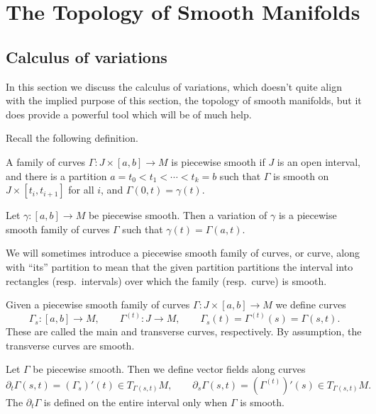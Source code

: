 \section{The Topology of Smooth Manifolds}

\subsection{Calculus of variations}

In this section we discuss the calculus of variations, which doesn't quite align with the implied purpose of this section, the topology
of smooth manifolds, but it does provide a powerful tool which will be of much help.

Recall the following definition.

\bdefn

    A family of curves $\Gamma\colon J\times[a,b]\to M$ is {\emphcolor piecewise smooth} if
    $J$ is an open interval, and there is a partition $a=t_0<t_1<\cdots<t_k=b$ such that $\Gamma$ is smooth on
    $J\times[t_i,t_{i+1}]$ for all $i$, and $\Gamma(0,t)=\gamma(t)$.

    Let $\gamma\colon[a,b]\to M$ be piecewise smooth.
    Then a {\emphcolor variation} of $\gamma$ is a piecewise smooth family of curves $\Gamma$ such that $\gamma(t)=\Gamma(a,t)$.

\edefn

\bnote

    We will sometimes introduce a piecewise smooth family of curves, or curve, along with ``its'' partition to mean that the
    given partition partitions the interval into rectangles (resp.\ intervals) over which the family (resp.\ curve) is smooth.

\enote

Given a piecewise smooth family of curves $\Gamma\colon J\times[a,b]\to M$ we define curves
$$ \Gamma_s\colon[a,b]\to M,\qquad \Gamma^{(t)}\colon J\to M,\qquad \Gamma_s(t) = \Gamma^{(t)}(s) = \Gamma(s,t) . $$
These are called the {\emphcolor main} and {\emphcolor transverse} curves, respectively.
By assumption, the transverse curves are smooth.

\bdefn

    Let $\Gamma$ be piecewise smooth.
    Then we define vector fields along curves
    $$ \partial_t\Gamma(s,t) = (\Gamma_s)'(t) \in T_{\Gamma(s,t)}M,\qquad \partial_s\Gamma(s,t) =
    (\Gamma^{(t)})'(s) \in T_{\Gamma(s,t)}M . $$
    The $\partial_t\Gamma$ is defined on the entire interval only when $\Gamma$ is smooth.

